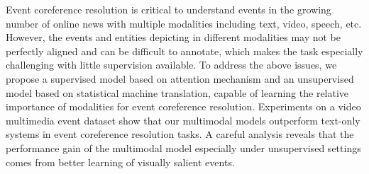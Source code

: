 Event coreference resolution is critical to understand events in the growing number of online news with multiple modalities including text, video, speech, etc. However, the events and entities depicting in different modalities may not be perfectly aligned and can be difficult to annotate, which makes the task especially challenging with little supervision available. To address the above issues, we propose a supervised model based on attention mechanism and an unsupervised model based on statistical machine translation, capable of learning the relative importance of modalities for event coreference resolution. Experiments on a video multimedia event dataset show that our multimodal models outperform text-only systems in event coreference resolution tasks. A careful analysis reveals that the performance gain of the multimodal model especially under unsupervised settings comes from better learning of visually salient events.
